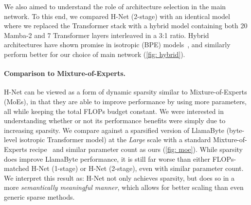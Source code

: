 \documentclass{article}
\newcommand{\citep}{\parencite}
\newcommand{\model}{H-Net}
\newcommand{\main}{main network}
\theoremstyle{plain}
\theoremstyle{remark}
\begin{document}
We also aimed to understand the role of architecture selection in the \main{}.
To this end, we compared \model{} (2-stage) with an identical model where we replaced the Transformer stack with a hybrid model containing both 20 Mamba-2 and 7 Transformer layers interleaved in a 3:1 ratio.
Hybrid architectures have shown promise in isotropic (BPE) models~\citep{NvidiaMambaHybrid}, and similarly perform better for our choice of \main{} (\cref{fig: hybrid}).

\paragraph{Comparison to Mixture-of-Experts.}

\model{} can be viewed as a form of dynamic sparsity similar to Mixture-of-Experts (MoEs), in that they are able to improve performance by using more parameters, all while keeping the total FLOPs budget constant.
We were interested in understanding whether or not its performance benefits were simply due to increasing sparsity.
We compare against a sparsified version of LlamaByte (byte-level isotropic Transformer model) at the \textit{Large} scale with a standard Mixture-of-Experts recipe~\citep{MoE} and similar parameter count as ours (\cref{fig: moe}).
While sparsity does improve LlamaByte performance, it is still far worse than either FLOPs-matched \model{} (1-stage) or \model{} (2-stage), even with similar parameter count.
We interpret this result as: \model{} not only achieves sparsity, but does so in a more \textit{semantically meaningful manner}, which allows for better scaling than even generic sparse methods.

\def\thinmidrule{\noalign{\hrule height.8pt}}
\end{document}
